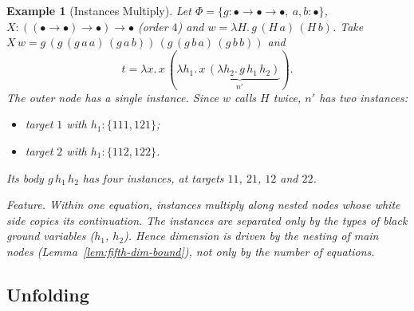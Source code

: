 \documentclass[10pt,a4paper]{article}
\theoremstyle{plain}%
\newtheorem{example}[theorem]{Example}
\begin{document}
\begin{example}[Instances Multiply]\label{ex:ex-instances}
Let $\Phi = \{g : \bullet\to\bullet\to\bullet,\ a,b : \bullet\}$, $X : ((\bullet\to\bullet)\to\bullet)\to\bullet$ (order $4$) and $w = \lambda H.\,g\,(H\,a)\,(H\,b)$.
Take $X\,w = g\,(g\,(g\,a\,a)\,(g\,a\,b))\,(g\,(g\,b\,a)\,(g\,b\,b))$ and
\[
t = \lambda x.\,x\,(\lambda h_1.\,\underbrace{x\,(\lambda h_2.\,g\,h_1\,h_2)}_{n'}).
\]
The outer node has a single instance.
Since $w$ calls $H$ twice, $n'$ has two instances:
\begin{itemize}
\item target $1$ with $h_1 : \{111, 121\}$;
\item target $2$ with $h_1 : \{112, 122\}$.
\end{itemize}
Its body $g\,h_1\,h_2$ has four instances, at targets $11$, $21$, $12$ and $22$.

\emph{Feature.}
Within one equation, instances multiply along nested nodes whose white side copies its continuation.
The instances are separated only by the types of black ground variables ($h_1$, $h_2$).
Hence dimension is driven by the nesting of main nodes (Lemma~\ref{lem:fifth-dim-bound}), not only by the number of equations.
\end{example}

\subsection{Unfolding}
\end{document}
